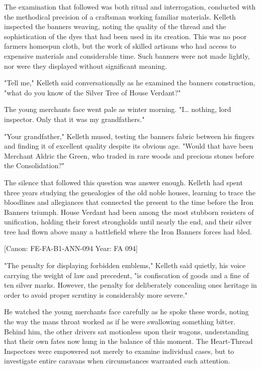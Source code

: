 The examination that followed was both ritual and interrogation,
conducted with the methodical precision of a craftsman working familiar
materials. Kelleth inspected the banner\textquotesingle s weaving,
noting the quality of the thread and the sophistication of the dyes that
had been used in its creation. This was no poor farmer\textquotesingle s
homespun cloth, but the work of skilled artisans who had access to
expensive materials and considerable time. Such banners were not made
lightly, nor were they displayed without significant meaning.

"Tell me," Kelleth said conversationally as he examined the
banner\textquotesingle s construction, "what do you know of the Silver
Tree of House Verdant?"

The young merchant\textquotesingle s face went pale as winter morning.
"I\ldots{} nothing, lord inspector. Only that it was my
grandfather\textquotesingle s."

"Your grandfather," Kelleth mused, testing the banner\textquotesingle s
fabric between his fingers and finding it of excellent quality despite
its obvious age. "Would that have been Merchant Aldric the Green, who
traded in rare woods and precious stones before the Consolidation?"

The silence that followed this question was answer enough. Kelleth had
spent three years studying the genealogies of the old noble houses,
learning to trace the bloodlines and allegiances that connected the
present to the time before the Iron Banner\textquotesingle s triumph.
House Verdant had been among the most stubborn resisters of unification,
holding their forest strongholds until nearly the end, and their silver
tree had flown above many a battlefield where the Iron
Banner\textquotesingle s forces had bled.

{[}Canon: FE-FA-B1-ANN-094 \textbar{} Year: FA 094{]}

"The penalty for displaying forbidden emblems," Kelleth said quietly,
his voice carrying the weight of law and precedent, "is confiscation of
goods and a fine of ten silver marks. However, the penalty for
deliberately concealing one\textquotesingle s heritage in order to avoid
proper scrutiny is considerably more severe."

He watched the young merchant\textquotesingle s face carefully as he
spoke these words, noting the way the man\textquotesingle s throat
worked as if he were swallowing something bitter. Behind him, the other
drivers sat motionless upon their wagons, understanding that their own
fates now hung in the balance of this moment. The Heart-Thread
Inspectors were empowered not merely to examine individual cases, but to
investigate entire caravans when circumstances warranted such attention.

